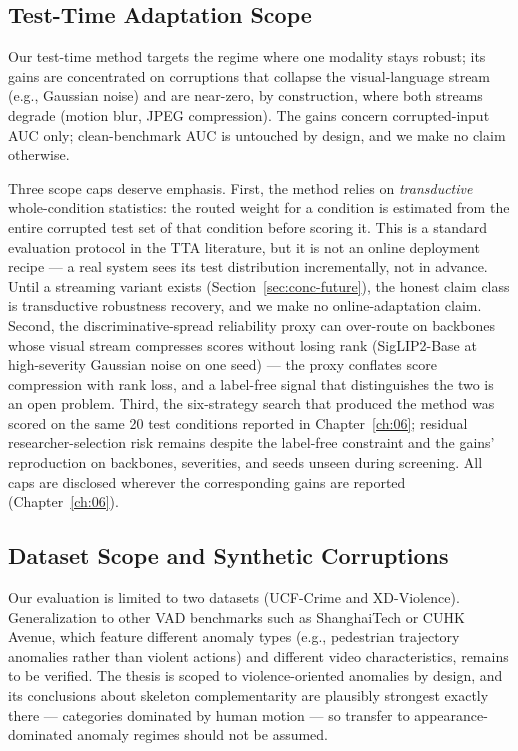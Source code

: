 \subsection{Test-Time Adaptation Scope}
\label{sec:lim-tta}

Our test-time method targets the regime where one modality stays robust; its
gains are concentrated on corruptions that collapse the visual-language stream
(e.g., Gaussian noise) and are near-zero, by construction, where both streams
degrade (motion blur, JPEG compression). The gains concern corrupted-input AUC
only; clean-benchmark AUC is untouched by design, and we make no claim
otherwise.

Three scope caps deserve emphasis. First, the method relies on
\emph{transductive} whole-condition statistics: the routed weight for a
condition is estimated from the entire corrupted test set of that condition
before scoring it. This is a standard evaluation protocol in the TTA
literature, but it is not an online deployment recipe --- a real system sees
its test distribution incrementally, not in advance. Until a streaming variant
exists (Section~\ref{sec:conc-future}), the honest claim class is transductive
robustness recovery, and we make no online-adaptation claim. Second, the
discriminative-spread reliability proxy can over-route on backbones whose
visual stream compresses scores without losing rank (SigLIP2-Base at
high-severity Gaussian noise on one seed) --- the proxy conflates score
compression with rank loss, and a label-free signal that distinguishes the two
is an open problem. Third, the six-strategy search that produced the method
was scored on the same 20 test conditions reported in Chapter~\ref{ch:06};
residual researcher-selection risk remains despite the label-free constraint
and the gains' reproduction on backbones, severities, and seeds unseen during
screening. All caps are disclosed wherever the corresponding gains are
reported (Chapter~\ref{ch:06}).

\subsection{Dataset Scope and Synthetic Corruptions}
\label{sec:lim-scope}

Our evaluation is limited to two datasets (UCF-Crime and XD-Violence).
Generalization to other VAD benchmarks such as ShanghaiTech or CUHK Avenue,
which feature different anomaly types (e.g., pedestrian trajectory anomalies
rather than violent actions) and different video characteristics, remains to
be verified. The thesis is scoped to violence-oriented anomalies by design,
and its conclusions about skeleton complementarity are plausibly strongest
exactly there --- categories dominated by human motion --- so transfer to
appearance-dominated anomaly regimes should not be assumed.

